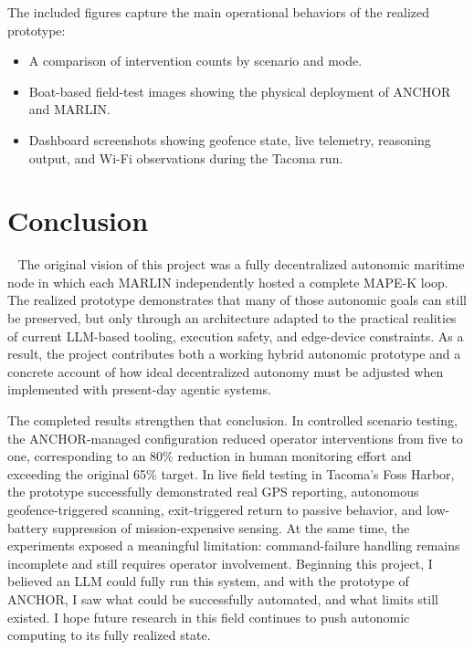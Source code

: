 \documentclass[journal]{IEEEtran}
\begin{document}
The included figures capture the main operational behaviors of the realized prototype:

\begin{itemize}
    \item A comparison of intervention counts by scenario and mode.
    \item Boat-based field-test images showing the physical deployment of ANCHOR and MARLIN.
    \item Dashboard screenshots showing geofence state, live telemetry, reasoning output, and Wi-Fi observations during the Tacoma run.
\end{itemize}

\section{Conclusion}~\label{conclusion}
The original vision of this project was a fully decentralized autonomic maritime node in which each MARLIN independently hosted a complete MAPE-K loop. The realized prototype demonstrates that many of those autonomic goals can still be preserved, but only through an architecture adapted to the practical realities of current LLM-based tooling, execution safety, and edge-device constraints. As a result, the project contributes both a working hybrid autonomic prototype and a concrete account of how ideal decentralized autonomy must be adjusted when implemented with present-day agentic systems.

The completed results strengthen that conclusion. In controlled scenario testing, the ANCHOR-managed configuration reduced operator interventions from five to one, corresponding to an 80\% reduction in human monitoring effort and exceeding the original 65\% target. In live field testing in Tacoma's Foss Harbor, the prototype successfully demonstrated real GPS reporting, autonomous geofence-triggered scanning, exit-triggered return to passive behavior, and low-battery suppression of mission-expensive sensing. At the same time, the experiments exposed a meaningful limitation: command-failure handling remains incomplete and still requires operator involvement. Beginning this project, I believed an LLM could fully run this system, and with the prototype of ANCHOR, I saw what could be successfully automated, and what limits still existed. I hope future research in this field continues to push autonomic computing to its fully realized state.



\end{document}
